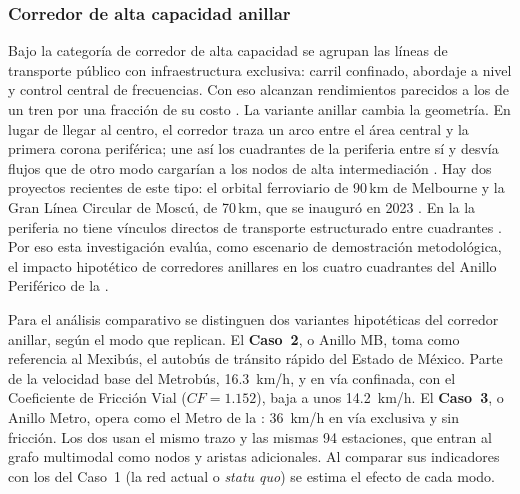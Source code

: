 \subsubsection*{Corredor de alta capacidad anillar}
\label{subsubsec:glosario-corredor-anillar}
Bajo la categoría de corredor de alta capacidad \citep{douma2003} se agrupan
las líneas de transporte público con infraestructura exclusiva: carril
confinado, abordaje a nivel y control central de frecuencias. Con eso alcanzan
rendimientos parecidos a los de un tren por una fracción de su costo
\citep{molinero2002}. La variante anillar cambia la geometría. En lugar de
llegar al centro, el corredor traza un arco entre el área central y la primera
corona periférica; une así los cuadrantes de la periferia entre sí y desvía
flujos que de otro modo cargarían a los nodos de alta intermediación
\citep{aldous2019optimal}. Hay dos proyectos recientes de este tipo: el
orbital ferroviario de 90\,km de Melbourne \citep{suburbanrailloop2021} y la
Gran Línea Circular de Moscú, de 70\,km, que se inauguró en 2023
\citep{efe2023}. En la \zmvm{} la periferia no tiene vínculos directos de
transporte estructurado entre cuadrantes \citep{obras2025}. Por eso esta
investigación evalúa, como escenario de demostración metodológica, el impacto
hipotético de corredores anillares en los cuatro cuadrantes del Anillo
Periférico de la \cdmx{}.

Para el análisis comparativo se distinguen dos variantes hipotéticas del
corredor anillar, según el modo que replican. El \textbf{Caso~2}, o Anillo MB,
toma como referencia al Mexibús, el autobús de tránsito rápido del Estado de
México. Parte de la velocidad base del Metrobús, 16.3~km/h, y en vía confinada,
con el Coeficiente de Fricción Vial ($CF = 1.152$), baja a unos 14.2~km/h. El
\textbf{Caso~3}, o Anillo Metro, opera como el Metro de la \cdmx{}: 36~km/h en
vía exclusiva y sin fricción. Los dos usan el mismo trazo y las mismas 94
estaciones, que entran al grafo multimodal como nodos y aristas adicionales.
Al comparar sus indicadores con los del Caso~1 (la red actual o
\textit{statu quo}) se estima el efecto de cada modo.

